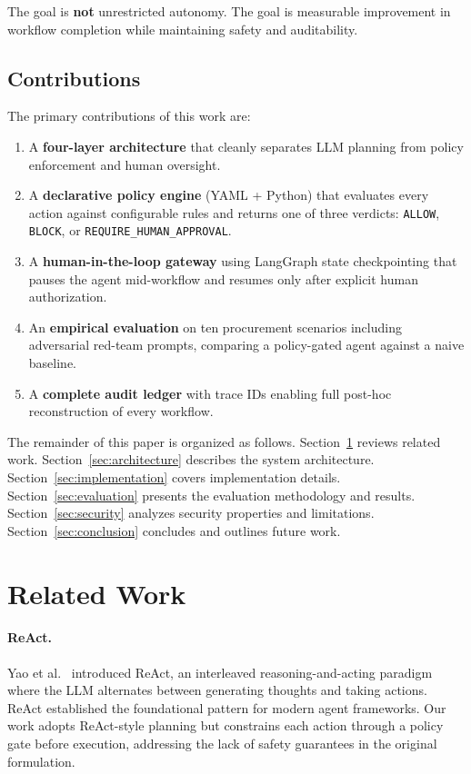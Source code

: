 \documentclass[11pt,a4paper]{article}
\begin{document}
The goal is \textbf{not} unrestricted autonomy. The goal is measurable improvement in workflow completion while maintaining safety and auditability.

\subsection{Contributions}

The primary contributions of this work are:

\begin{enumerate}[leftmargin=*, itemsep=2pt]
    \item A \textbf{four-layer architecture} that cleanly separates LLM planning from policy enforcement and human oversight.
    \item A \textbf{declarative policy engine} (YAML + Python) that evaluates every action against configurable rules and returns one of three verdicts: \texttt{ALLOW}, \texttt{BLOCK}, or \texttt{REQUIRE\_HUMAN\_APPROVAL}.
    \item A \textbf{human-in-the-loop gateway} using LangGraph state checkpointing that pauses the agent mid-workflow and resumes only after explicit human authorization.
    \item An \textbf{empirical evaluation} on ten procurement scenarios including adversarial red-team prompts, comparing a policy-gated agent against a naive baseline.
    \item A \textbf{complete audit ledger} with trace IDs enabling full post-hoc reconstruction of every workflow.
\end{enumerate}

The remainder of this paper is organized as follows. Section~\ref{sec:related} reviews related work. Section~\ref{sec:architecture} describes the system architecture. Section~\ref{sec:implementation} covers implementation details. Section~\ref{sec:evaluation} presents the evaluation methodology and results. Section~\ref{sec:security} analyzes security properties and limitations. Section~\ref{sec:conclusion} concludes and outlines future work.

\section{Related Work}
\label{sec:related}

\paragraph{ReAct.} Yao et al.~\cite{yao2023react} introduced ReAct, an interleaved reasoning-and-acting paradigm where the LLM alternates between generating thoughts and taking actions. ReAct established the foundational pattern for modern agent frameworks. Our work adopts ReAct-style planning but constrains each action through a policy gate before execution, addressing the lack of safety guarantees in the original formulation.
\end{document}
